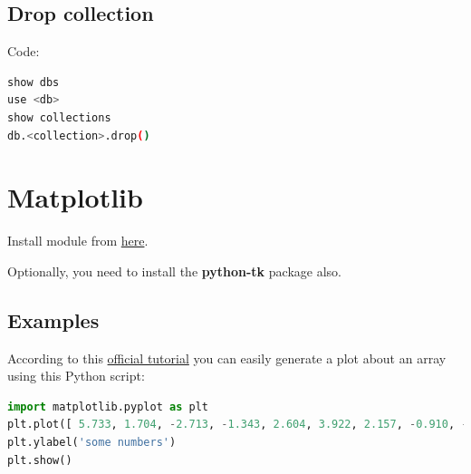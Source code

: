 \documentclass[12pt, a4paper, portrait]{article}
\begin{document}
\subsection{Drop collection}
Code:
\begin{lstlisting}[language=bash, caption=MongoDB shell commands to drop a collection]
show dbs
use <db>
show collections
db.<collection>.drop()
\end{lstlisting}

\pagebreak
\section{Matplotlib}
Install module from \href{https://matplotlib.org/users/installing.html#linux-using-your-package-manager}{here}.
\par Optionally, you need to install the \textbf{python-tk} package also.
\subsection{Examples}
According to this \href{https://matplotlib.org/users/pyplot_tutorial.html}{official tutorial} you can easily generate a plot about an array using this Python script:
\begin{lstlisting}[language=Python]
import matplotlib.pyplot as plt
plt.plot([ 5.733, 1.704, -2.713, -1.343, 2.604, 3.922, 2.157, -0.910, -2.414, -2.943, -1.526, -0.823])
plt.ylabel('some numbers')
plt.show()
\end{lstlisting}
\end{document}
